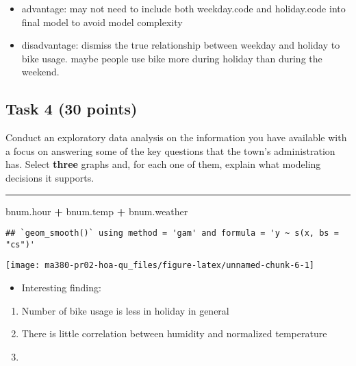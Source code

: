 \documentclass[
]{article}
\newenvironment{Shaded}{\begin{snugshade}}{\end{snugshade}}
\newcommand{\NormalTok}[1]{#1}
\newcommand{\SpecialCharTok}[1]{\textcolor[rgb]{0.81,0.36,0.00}{\textbf{#1}}}
\providecommand{\tightlist}{%
  \setlength{\itemsep}{0pt}\setlength{\parskip}{0pt}}
\begin{document}
\begin{itemize}
\tightlist
\item
  advantage: may not need to include both weekday.code and holiday.code
  into final model to avoid model complexity
\item
  disadvantage: dismiss the true relationship between weekday and
  holiday to bike usage. maybe people use bike more during holiday than
  during the weekend.
\end{itemize}

\hypertarget{task-4-30-points}{%
\subsection{Task 4 (30 points)}\label{task-4-30-points}}

Conduct an exploratory data analysis on the information you have
available with a focus on answering some of the key questions that the
town's administration has. Select \textbf{three} graphs and, for each
one of them, explain what modeling decisions it supports.

\begin{center}\rule{0.5\linewidth}{0.5pt}\end{center}

\begin{Shaded}
\begin{Highlighting}[]
\NormalTok{bnum.hour }\SpecialCharTok{+}\NormalTok{ bnum.temp }\SpecialCharTok{+}\NormalTok{ bnum.weather}
\end{Highlighting}
\end{Shaded}

\begin{verbatim}
## `geom_smooth()` using method = 'gam' and formula = 'y ~ s(x, bs = "cs")'
\end{verbatim}

\begin{center}\texttt{[image: ma380-pr02-hoa-qu\_files/figure-latex/unnamed-chunk-6-1]} \end{center}

\begin{itemize}
\tightlist
\item
  Interesting finding:
\end{itemize}

\begin{enumerate}
\def\labelenumi{\arabic{enumi}.}
\tightlist
\item
  Number of bike usage is less in holiday in general
\item
  There is little correlation between humidity and normalized
  temperature
\item
\end{enumerate}
\end{document}
